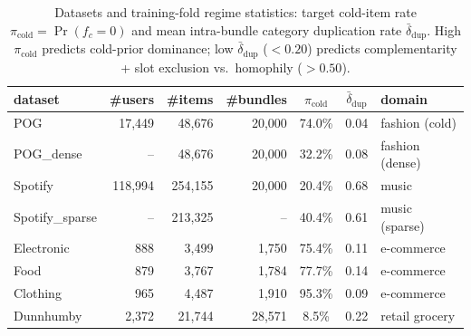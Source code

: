 \begin{table}[t]\centering\small
\caption{Datasets and training-fold regime statistics: target cold-item rate $\pi_{\text{cold}} = \Pr(f_c=0)$ and
mean intra-bundle category duplication rate $\bar{\delta}_{\text{dup}}$. High $\pi_{\text{cold}}$ predicts cold-prior
dominance; low $\bar{\delta}_{\text{dup}}$ ($<0.20$) predicts complementarity + slot exclusion vs.\ homophily
($>0.50$).}
\label{tab:data}
\begin{tabular}{lrrrcc l}
\toprule
dataset & \#users & \#items & \#bundles & $\pi_{\text{cold}}$ & $\bar{\delta}_{\text{dup}}$ & domain \\
\midrule
POG            & 17{,}449 & 48{,}676 & 20{,}000 & 74.0\% & 0.04 & fashion (cold) \\
POG\_dense     & --       & 48{,}676 & 20{,}000 & 32.2\% & 0.08 & fashion (dense) \\
Spotify        & 118{,}994& 254{,}155& 20{,}000 & 20.4\% & 0.68 & music \\
Spotify\_sparse& --       & 213{,}325& --       & 40.4\% & 0.61 & music (sparse) \\
Electronic     & 888      & 3{,}499  & 1{,}750  & 75.4\% & 0.11 & e-commerce \\
Food           & 879      & 3{,}767  & 1{,}784  & 77.7\% & 0.14 & e-commerce \\
Clothing       & 965      & 4{,}487  & 1{,}910  & 95.3\% & 0.09 & e-commerce \\
Dunnhumby      & 2{,}372  & 21{,}744 & 28{,}571 &  8.5\% & 0.22 & retail grocery \\
\bottomrule
\end{tabular}
\end{table}


